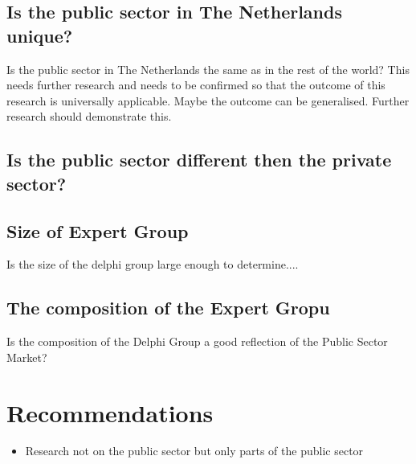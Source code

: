 \subsection{Is the public sector in The Netherlands unique?}
\label{sub:discussionpublicsector}
Is the public sector in The Netherlands the same as in the rest of the world? This needs further research and needs to be confirmed so that the outcome of this research is universally applicable. Maybe the outcome can be generalised. Further research should demonstrate this.

\subsection{Is the public sector different then the private sector?}
\label{sub:discussionpublicvsprivate}


\subsection{Size of Expert Group}
\label{sub:discussionsizeofeg}
Is the size of the delphi group large enough to determine....
\subsection{The composition of the Expert Gropu}
\label{sub:compositionofeg}
Is the composition of the Delphi Group a good reflection of the Public Sector Market?

\section{Recommendations}
\label{sec:reccomandations}

\begin{itemize}
	\item{Research not on the public sector but only parts of the public sector}
\end{itemize}